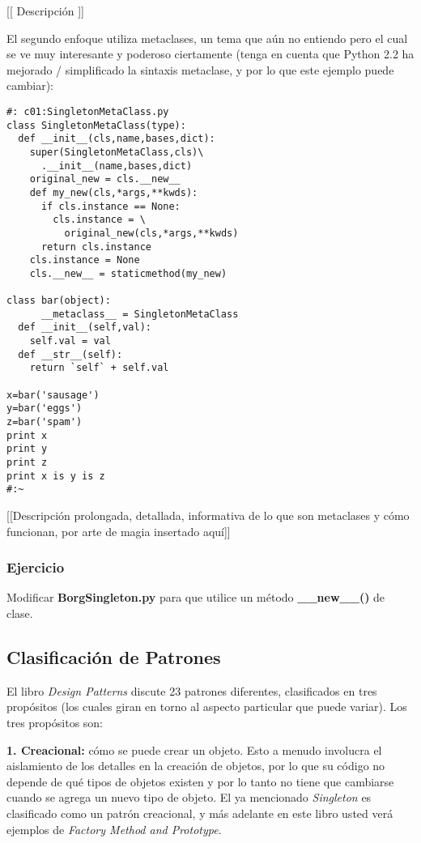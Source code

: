 [[ Descripción ]] \newline

El segundo enfoque utiliza metaclases, un tema que aún no entiendo pero el cual se ve muy interesante y poderoso ciertamente (tenga en cuenta que Python 2.2 ha mejorado / simplificado la sintaxis metaclase, y por lo que este ejemplo puede cambiar): \newline

\begin{lstlisting}
#: c01:SingletonMetaClass.py 
class SingletonMetaClass(type): 
  def __init__(cls,name,bases,dict): 
    super(SingletonMetaClass,cls)\ 
      .__init__(name,bases,dict) 
    original_new = cls.__new__ 
    def my_new(cls,*args,**kwds): 
      if cls.instance == None: 
        cls.instance = \ 
          original_new(cls,*args,**kwds) 
      return cls.instance 
    cls.instance = None 
    cls.__new__ = staticmethod(my_new) 
    
class bar(object): 
      __metaclass__ = SingletonMetaClass 
  def __init__(self,val): 
    self.val = val 
  def __str__(self): 
    return `self` + self.val 
    
x=bar('sausage') 
y=bar('eggs') 
z=bar('spam') 
print x 
print y 
print z 
print x is y is z 
#:~ 
\end{lstlisting}
  
[[Descripción prolongada, detallada, informativa de lo que son metaclases y cómo funcionan, por arte de magia insertado aquí]]    

\subsubsection*{Ejercicio}
Modificar \textbf{BorgSingleton.py} para que utilice un método \textbf{\_\_new\_\_()} de clase.

\subsection*{Clasificación de Patrones}
\label{subsec:clPat}

El libro \textit{Design Patterns} discute 23 patrones diferentes, clasificados en tres propósitos (los cuales giran en torno al aspecto particular que puede variar). Los tres propósitos son:  \newline

\textbf{1. Creacional:} 
cómo se puede crear un objeto. Esto a menudo involucra el aislamiento de los detalles en la creación de objetos, por lo que su código no depende de qué tipos de objetos existen y por lo tanto no tiene que cambiarse cuando se agrega un nuevo tipo de objeto. El ya mencionado \textit{Singleton} es clasificado como un patrón creacional, y más adelante en este libro usted verá ejemplos de \textit{Factory Method and Prototype}.     \newline

